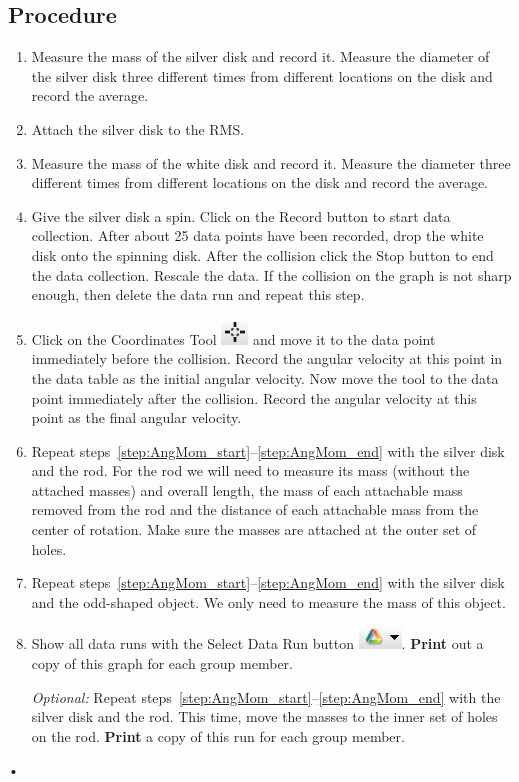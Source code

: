 \documentclass[main.tex]{subfiles}
\begin{document}
\subsection*{Procedure}
\begin{enumerate}
\item
Measure the mass of the silver disk and record it. Measure the diameter of the silver disk three different times from different locations on the disk and record the average.
\item
Attach the silver disk to the RMS.
\item \label{step:AngMom_start}
Measure the mass of the white disk and record it. Measure the diameter three different times from different locations on the disk and record the average.
\item
Give the silver disk a spin. Click on the Record button to start data collection. After about 25 data points have been recorded, drop the white disk onto the spinning disk. After the collision click the Stop button to end the data collection. Rescale the data. If the collision on the graph is not sharp enough, then delete the data run and repeat this step.
\item \label{step:AngMom_end}
Click on the Coordinates Tool \includegraphics{Coordinates_Tool} and move it to the data point immediately before the collision. Record the angular velocity at this point in the data table as the initial angular velocity. Now move the tool to the data point immediately after the collision. Record the angular velocity at this point as the final angular velocity.
\item
Repeat steps~\ref{step:AngMom_start}--\ref{step:AngMom_end} with the silver disk and the rod. For the rod we will need to measure its mass (without the attached masses) and overall length, the mass of each attachable mass removed from the rod and the distance of each attachable mass from the center of rotation. Make sure the masses are attached at the outer set of holes.
\item
Repeat steps~\ref{step:AngMom_start}--\ref{step:AngMom_end} with the silver disk and the odd-shaped object. We only need to measure the mass of this object.
\item
Show all data runs with the Select Data Run button \includegraphics{Select_Data_Run}. \textbf{Print} out a copy of this graph for each group member.
\item[\emph{Optional:}]
Repeat steps~\ref{step:AngMom_start}--\ref{step:AngMom_end} with the silver disk and the rod. This time, move the masses to the inner set of holes on the rod. \textbf{Print} a copy of this run for each group member.
\end{enumerate}•
\end{document}
